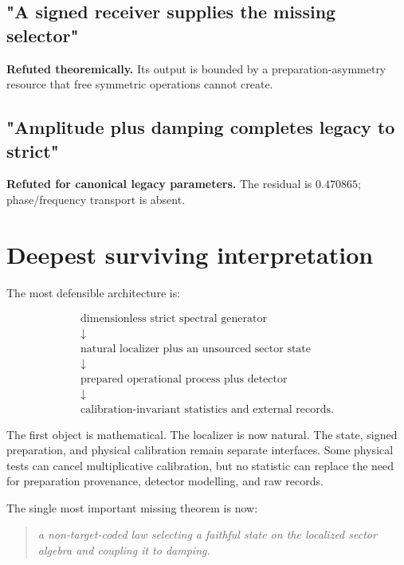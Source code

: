\documentclass[11pt,a4paper,openany]{report}
\begin{document}
\subsection{"A signed receiver supplies the missing selector"}

\textbf{Refuted theoremically.} Its output is bounded by a preparation-asymmetry resource that free symmetric operations cannot create.

\subsection{"Amplitude plus damping completes legacy to strict"}

\textbf{Refuted for canonical legacy parameters.} The residual is \(0.470865\); phase/\allowbreak{}frequency transport is absent.

\section{Deepest surviving interpretation}

The most defensible architecture is:

\[
\begin{gathered}
\boxed{\text{dimensionless strict spectral generator}}
\\ \downarrow \\
\boxed{\text{natural localizer plus an unsourced sector state}}
\\ \downarrow \\
\boxed{\text{prepared operational process plus detector}}
\\ \downarrow \\
\boxed{\text{calibration-invariant statistics and external records}}.
\end{gathered}
\]

The first object is mathematical. The localizer is now natural. The state, signed preparation, and physical calibration remain separate interfaces. Some physical tests can cancel multiplicative calibration, but no statistic can replace the need for preparation provenance, detector modelling, and raw records.

The single most important missing theorem is now:

\begin{quote}\itshape
a non-target-coded law selecting a faithful state on the localized sector algebra and coupling it to damping.

\end{quote}
\end{document}

